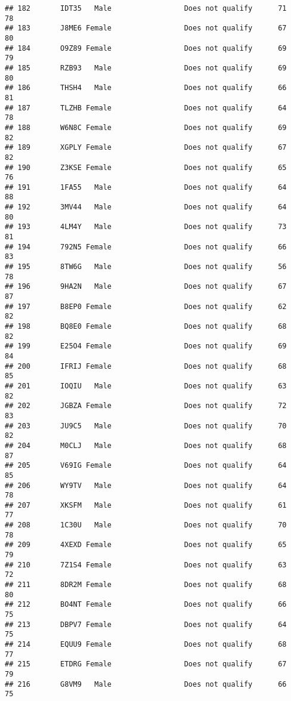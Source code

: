 \documentclass[
]{article}
\begin{document}
\begin{verbatim}
## 182       IDT35   Male                 Does not qualify      71       78
## 183       J8ME6 Female                 Does not qualify      67       80
## 184       O9Z89 Female                 Does not qualify      69       79
## 185       RZB93   Male                 Does not qualify      69       80
## 186       THSH4   Male                 Does not qualify      66       81
## 187       TLZHB Female                 Does not qualify      64       78
## 188       W6N8C Female                 Does not qualify      69       82
## 189       XGPLY Female                 Does not qualify      67       82
## 190       Z3KSE Female                 Does not qualify      65       76
## 191       1FA55   Male                 Does not qualify      64       88
## 192       3MV44   Male                 Does not qualify      64       80
## 193       4LM4Y   Male                 Does not qualify      73       81
## 194       792N5 Female                 Does not qualify      66       83
## 195       8TW6G   Male                 Does not qualify      56       78
## 196       9HA2N   Male                 Does not qualify      67       87
## 197       B8EP0 Female                 Does not qualify      62       82
## 198       BQ8E0 Female                 Does not qualify      68       82
## 199       E25O4 Female                 Does not qualify      69       84
## 200       IFRIJ Female                 Does not qualify      68       85
## 201       IOQIU   Male                 Does not qualify      63       82
## 202       JGBZA Female                 Does not qualify      72       83
## 203       JU9C5   Male                 Does not qualify      70       82
## 204       M0CLJ   Male                 Does not qualify      68       87
## 205       V69IG Female                 Does not qualify      64       85
## 206       WY9TV   Male                 Does not qualify      64       78
## 207       XKSFM   Male                 Does not qualify      61       77
## 208       1C30U   Male                 Does not qualify      70       78
## 209       4XEXD Female                 Does not qualify      65       79
## 210       7Z1S4 Female                 Does not qualify      63       72
## 211       8DR2M Female                 Does not qualify      68       80
## 212       BO4NT Female                 Does not qualify      66       75
## 213       DBPV7 Female                 Does not qualify      64       75
## 214       EQUU9 Female                 Does not qualify      68       77
## 215       ETDRG Female                 Does not qualify      67       79
## 216       G8VM9   Male                 Does not qualify      66       75

\end{verbatim}
\end{document}
